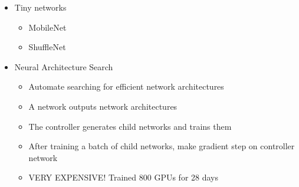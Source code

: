 \documentclass[../main.tex]{subfiles}
\begin{document}
\begin{itemize}
\begin{itemize}
\begin{figure}[h]
    \end{figure}
  \end{itemize}
  \item Tiny networks
  \begin{itemize}
    \item MobileNet
    \item ShuffleNet
  \end{itemize}
  \item Neural Architecture Search
  \begin{itemize}
    \item Automate searching for efficient network architectures
    \item A network outputs network architectures
    \item The controller generates child networks and trains them
    \item After training a batch of child networks, make gradient step on controller network
    \item VERY EXPENSIVE! Trained 800 GPUs for 28 days
  \end{itemize}
\end{itemize}
\end{document}

